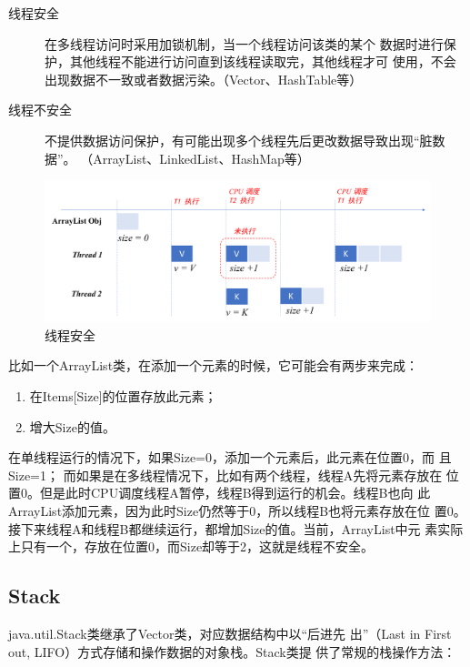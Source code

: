 \begin{description}
\item[线程安全] 在多线程访问时采用加锁机制，当一个线程访问该类的某个
  数据时进行保护，其他线程不能进行访问直到该线程读取完，其他线程才可
  使用，不会出现数据不一致或者数据污染。（Vector、HashTable等）
\item[线程不安全] 不提供数据访问保护，有可能出现多个线程先后更改数据导致出现“脏数据”。
  （ArrayList、LinkedList、HashMap等）
\end{description}

\begin{figure}[htb]
\centering
\includegraphics[width=\textwidth]{images/Set-list-map/thread-safe.pdf}
\caption{线程安全}
\label{fig:thread-safe}
\end{figure}

比如一个ArrayList类，在添加一个元素的时候，它可能会有两步来完成：

\begin{enumerate}
\item 在Items[Size]的位置存放此元素；
\item 增大Size的值。
\end{enumerate}

在单线程运行的情况下，如果Size=0，添加一个元素后，此元素在位置0，而
且Size=1； 而如果是在多线程情况下，比如有两个线程，线程A先将元素存放在
位置0。但是此时CPU调度线程A暂停，线程B得到运行的机会。线程B也向
此ArrayList添加元素，因为此时Size仍然等于0，所以线程B也将元素存放在位
置0。接下来线程A和线程B都继续运行，都增加Size的值。当前，ArrayList中元
素实际上只有一个，存放在位置0，而Size却等于2，这就是{\hei 线程不安全}。

\subsection{Stack}

java.util.Stack类继承了Vector类，对应数据结构中以{\hei\Blue “后进先
  出”（Last in First out, LIFO）方式存储和操作数据的对象栈}。Stack类提
供了常规的栈操作方法：

